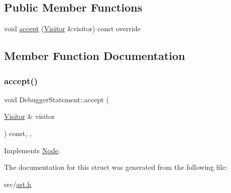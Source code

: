 \subsection*{Public Member Functions}
\begin{DoxyCompactItemize}
\item 
void \hyperlink{struct_debugger_statement_adb69027b0b27e1a8f74f4ddea5957799}{accept} (\hyperlink{struct_visitor}{Visitor} \&visitor) const override
\end{DoxyCompactItemize}


\subsection{Member Function Documentation}
\mbox{\label{struct_debugger_statement_adb69027b0b27e1a8f74f4ddea5957799}} 
\subsubsection{\texorpdfstring{accept()}{accept()}}
{\footnotesize\ttfamily void Debugger\+Statement\+::accept (\begin{DoxyParamCaption}\item[{\hyperlink{struct_visitor}{Visitor} \&}]{visitor }\end{DoxyParamCaption}) const\hspace{0.3cm}{\ttfamily [inline]}, {\ttfamily [override]}, {\ttfamily [virtual]}}



Implements \hyperlink{struct_node_a10bd7af968140bbf5fa461298a969c71}{Node}.



The documentation for this struct was generated from the following file\+:\begin{DoxyCompactItemize}
\item 
src/\hyperlink{ast_8h}{ast.\+h}\end{DoxyCompactItemize}
